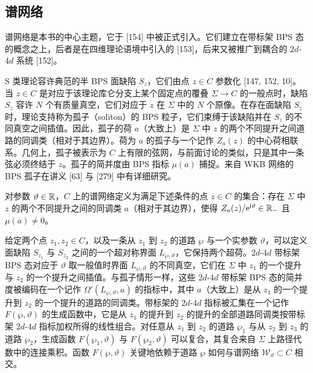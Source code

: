 \subsection*{谱网络}

谱网络是本书的中心主题，它于 [154] 中被正式引入。它们建立在带标架 BPS 态的概念之上，后者是在四维理论语境中引入的 [153]，后来又被推广到耦合的 $2d$-$4d$ 系统 [152]。

S 类理论容许典范的半 BPS 面缺陷 $S_z$，它们由点 $z\in C$ 参数化 [147, 152, 10]。当 $z\in C$ 是对应于该理论库仑分支上某个固定点的覆叠 $\Sigma\to C$ 的一般点时，缺陷 $S_z$ 容许 $N$ 个有质量真空，它们对应于 $z$ 在 $\Sigma$ 中的 $N$ 个原像。在存在面缺陷 $S_z$ 时，理论支持称为孤子（soliton）的 BPS 粒子，它们束缚于该缺陷并在 $S_z$ 的不同真空之间插值。因此，孤子的荷 $a$（大致上）是 $\Sigma$ 中 $z$ 的两个不同提升之间道路的同调类（相对于其边界）。荷为 $a$ 的孤子与一个记作 $Z_a(z)$ 的中心荷相联系。几何上，孤子被表示为 $C$ 上有限的弦网，与前面讨论的类似，只是其中一条弦必须终结于 $z$。孤子的简并度由 BPS 指标 $\mu(a)$ 捕捉。来自 WKB 网络的 BPS 孤子在讲义 [63] 与 [279] 中有详细研究。



对参数 $\vartheta\in\mathbb{R}$，$C$ 上的谱网络定义为满足下述条件的点 $z\in C$ 的集合：存在 $\Sigma$ 中 $z$ 的两个不同提升之间的同调类 $a$（相对于其边界），使得 $Z_a(z)/\mathrm{e}^{\mathrm{i}\vartheta}\in\mathbb{R}_-$ 且 $\mu(a)\ne 0$。

给定两个点 $z_1,z_2\in C$，以及一条从 $z_1$ 到 $z_2$ 的道路 $\wp$ 与一个实参数 $\vartheta$，可以定义面缺陷 $S_{z_1}$ 与 $S_{z_2}$ 之间的一个超对称界面 $L_{\wp,\vartheta}$，它保持两个超荷。$2d$-$4d$ 带标架 BPS 态对应于 $\vartheta$ 取一般值时界面 $L_{\wp,\vartheta}$ 的不同真空，它们在 $\Sigma$ 中 $z_1$ 的一个提升与 $z_2$ 的一个提升之间插值。与孤子情形一样，这些 $2d$-$4d$ 带标架 BPS 态的简并度被编码在一个记作 $\Omega'(L_{\wp,\vartheta},a)$ 的指标中，其中 $a$（大致上）是从 $z_1$ 的一个提升到 $z_2$ 的一个提升的道路的同调类。带标架的 $2d$-$4d$ 指标被汇集在一个记作 $F(\wp,\vartheta)$ 的生成函数中，它是从 $z_1$ 的提升到 $z_2$ 的提升的全部道路同调类按带标架 $2d$-$4d$ 指标加权所得的线性组合。对任意从 $z_1$ 到 $z_2$ 的道路 $\wp_1$ 与从 $z_2$ 到 $z_3$ 的道路 $\wp_2$，生成函数 $F(\wp_1,\vartheta)$ 与 $F(\wp_2,\vartheta)$ 可以复合，其复合来自 $\Sigma$ 上路径代数中的连接乘积。函数 $F(\wp,\vartheta)$ 关键地依赖于道路 $\wp$ 如何与谱网络 $\mathcal{W}_\vartheta\subset C$ 相交。

